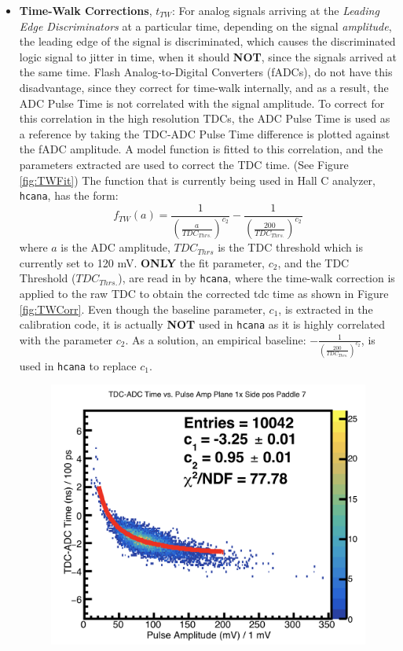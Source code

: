 \documentclass[14pt]{article}
\begin{document}
\begin{itemize}
\item \textbf{Time-Walk Corrections}, $t_{TW}$: For analog signals arriving at the \textit{Leading Edge Discriminators}
  at a particular time, depending on the signal \textit{amplitude}, the leading edge of the signal is discriminated,
  which causes the discriminated logic signal to jitter in time, when it should \textbf{NOT}, since the signals arrived at the
  same time. Flash Analog-to-Digital Converters (fADCs), do not have this disadvantage, since they correct for time-walk internally,
  and as a result, the ADC Pulse Time is not correlated with the signal amplitude. To correct for this correlation in the high resolution TDCs,
  the ADC Pulse Time is used as a reference by taking the TDC-ADC Pulse Time difference is plotted against the fADC amplitude. A model
  function is fitted to this correlation, and the parameters extracted are used to correct the TDC time. (See Figure \ref{fig:TWFit}) The function that is currently
  being used in Hall C analyzer, \texttt{hcana}, has the form:
  \begin{equation}
    f_{TW}(a) = \frac{1}{(\frac{a}{TDC_{Thrs.}})^{c_{2}}} - \frac{1}{(\frac{200}{TDC_{Thrs.}})^{c_{2}}}
  \end{equation}
  where $a$ is the ADC amplitude,  $TDC_{Thrs}$ is the TDC threshold which is currently set to 120 mV. \textbf{ONLY} the fit parameter, $c_{2}$, and the
  TDC Threshold ($TDC_{Thrs.}$), are read in by \texttt{hcana}, where the time-walk correction is applied to the raw TDC to obtain the corrected tdc time as shown in Figure \ref{fig:TWCorr}.
  Even though the baseline parameter, $c_{1}$, is extracted in the calibration code, it is actually \textbf{NOT} used in \texttt{hcana} as it is highly correlated with the parameter $c_{2}$.
  As a solution, an empirical baseline:  $-\frac{1}{(\frac{200}{TDC_{Thrs.}})^{c_{2}}}$, is used in \texttt{hcana} to replace $c_{1}$.
  \newpage
  \begin{figure}[H]
  \captionsetup{justification=raggedright,singlelinecheck=false}
    \includegraphics[scale=0.35]{1x7-_TWFit.png}

\end{figure}
\end{itemize}
\end{document}
